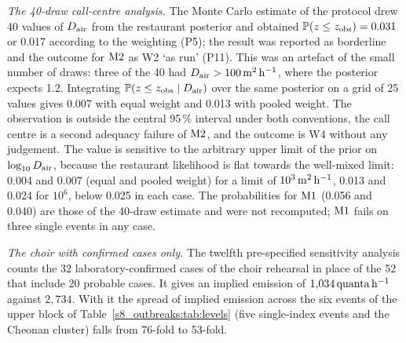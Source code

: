 \emph{The 40-draw call-centre analysis.} The Monte Carlo estimate of the protocol drew 40 values of $D_{\mathrm{air}}$ from the restaurant
posterior and obtained $\mathbb{P}(z\le z_{\mathrm{obs}})=0.031$ or 0.017 according to the weighting (P5); the
result was reported as borderline and the outcome for $\mathrm{M2}$ as W2 `as run' (P11). This was an artefact of the
small number of draws: three of the 40 had $D_{\mathrm{air}}>100\,\mathrm{m}^2\,\mathrm{h}^{-1}$, where the posterior expects 1.2. Integrating
$\mathbb{P}(z\le z_{\mathrm{obs}}\mid D_{\mathrm{air}})$ over the same posterior on a grid of 25 values gives 0.007 with equal
weight and 0.013 with pooled weight. The observation is outside the central 95\,\% interval under both
conventions, the call centre is a second adequacy failure of $\mathrm{M2}$, and the outcome is W4 without any
judgement. The value is sensitive to the arbitrary upper limit of the prior on $\log_{10}D_{\mathrm{air}}$, because the
restaurant likelihood is flat towards the well-mixed limit: 0.004 and 0.007 (equal and pooled weight) for a
limit of $10^{3}\,\mathrm{m}^2\,\mathrm{h}^{-1}$, 0.013 and 0.024 for $10^{6}$, below 0.025 in each case. The probabilities for $\mathrm{M1}$ (0.056 and 0.040) are those of the 40-draw estimate
and were not recomputed; $\mathrm{M1}$ fails on three single events in any case.

\emph{The choir with confirmed cases only.} The twelfth pre-specified sensitivity analysis counts the 32
laboratory-confirmed cases of the choir rehearsal in place of the 52 that include 20 probable cases. It gives
an implied emission of $1{,}034\,\mathrm{quanta}\,\mathrm{h}^{-1}$ against $2{,}734$. With it the spread of implied emission across the six events of the upper block of
Table~\ref{s8_outbreaks:tab:levels} (five single-index events and the Cheonan cluster) falls from 76-fold to
53-fold.

